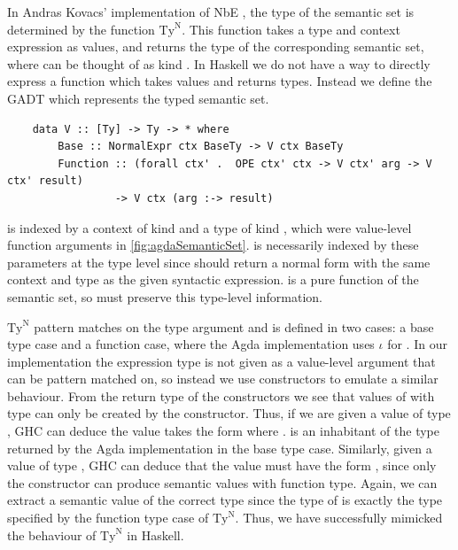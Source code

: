 In Andras Kovacs' implementation of NbE \cite{AgdaNbe}, the type of the semantic set is determined by the function $\text{Ty}^\text{N}$. This function takes a type and context expression as values, and returns the type of the corresponding semantic set, where  can be thought of as kind \code{*}. In Haskell we do not have a way to directly express a function which takes values and returns types. Instead we define the GADT  which represents the typed semantic set.

\begin{lstlisting}
    data V :: [Ty] -> Ty -> * where 
        Base :: NormalExpr ctx BaseTy -> V ctx BaseTy
        Function :: (forall ctx' .  OPE ctx' ctx -> V ctx' arg -> V ctx' result) 
                 -> V ctx (arg :-> result)
\end{lstlisting}

 is indexed by a context of kind \code{[Ty]} and a type of kind , which were value-level function arguments in \ref{fig:agdaSemanticSet}.  is necessarily indexed by these parameters at the type level since  should return a normal form with the same context and type as the given syntactic expression.  is a pure function of the semantic set, so  must preserve this type-level information. 

$\text{Ty}^\text{N}$ pattern matches on the type argument and is defined in two cases: a base type case and a function case, where the Agda implementation uses $\iota$ for . In our implementation the expression type is not given as a value-level argument that can be pattern matched on, so instead we use constructors to emulate a similar behaviour. From the return type of the constructors we see that values of  with type  can only be created by the  constructor. Thus, if we are given a value of type , GHC can deduce the value takes the form  where .  is an inhabitant of the type returned by the Agda implementation in the base type case. 
Similarly, given a value of type , GHC can deduce that the value must have the form , since only the  constructor can produce semantic values with function type. Again, we can extract a semantic value of the correct type since the type of  is exactly the type specified by the function type case of $\text{Ty}^\text{N}$. Thus, we have successfully mimicked the behaviour of $\text{Ty}^\text{N}$ in Haskell.

